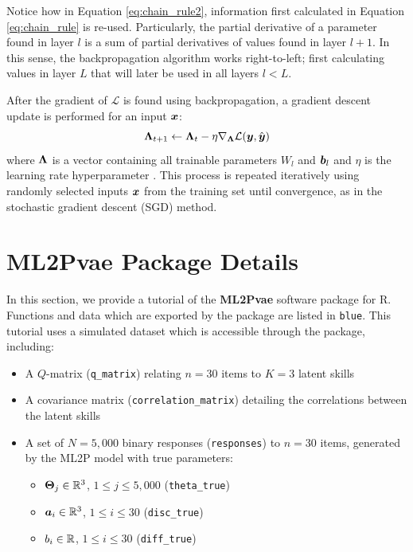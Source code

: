 Notice how in Equation \ref{eq:chain_rule2}, information first calculated in Equation \ref{eq:chain_rule} is re-used. Particularly, the partial derivative of a parameter found in layer $l$ is a sum of partial derivatives of values found in layer $l+1$. In this sense, the backpropagation algorithm works right-to-left; first calculating values in layer $L$ that will later be used in all layers $l<L$.

After the gradient of $\mathcal{L}$ is found using backpropagation, a gradient descent update is performed for an input $\boldsymbol{x}$:
\begin{equation}
  \boldsymbol{\Lambda}_{t+1} \gets \boldsymbol{\Lambda}_{t} - \eta \nabla_{\boldsymbol{\Lambda}} \mathcal{L}(\boldsymbol{y}, \hat{\boldsymbol{y}})
  \label{eq:grad_update}
\end{equation}
where $\boldsymbol{\Lambda}$ is a vector containing all trainable parameters $W_l$ and $\boldsymbol{b}_l$ and $\eta$ is the learning rate hyperparameter \cite{ruder2017}. This process is repeated iteratively using randomly selected inputs $\boldsymbol{x}$ from the training set until convergence, as in the stochastic gradient descent (SGD) method. 


\chapter{\textbf{ML2Pvae} Package Details} \label{apdx:software}
In this section, we provide a tutorial of the \textbf{ML2Pvae} software package for R. Functions and data which are exported by the package are listed in {\color{blue}\verb!blue!}. This tutorial uses a simulated dataset which is accessible through the package, including:
\begin{itemize}
  \item A $Q$-matrix ({\color{blue}\verb!q_matrix!}) relating $n = 30$ items to $K = 3$ latent skills
  \item A covariance matrix ({\color{blue}\verb!correlation_matrix!}) detailing the correlations between the latent skills
  \item A set of $N = 5,000$ binary responses ({\color{blue}\verb!responses!}) to $n = 30$ items, generated by the ML2P model with true parameters:
    \begin{itemize}
      \item $\boldsymbol{\Theta}_j \in \mathbb{R}^3$, $1\leq j \leq 5,000$ ({\color{blue}\verb!theta_true!})
      \item $\boldsymbol{a}_i \in \mathbb{R}^3$, $1\leq i \leq 30$ ({\color{blue}\verb!disc_true!})
      \item $b_i\in \mathbb{R}$, $1\leq i \leq 30$ ({\color{blue}\verb!diff_true!}) 
    \end{itemize}
\end{itemize}

